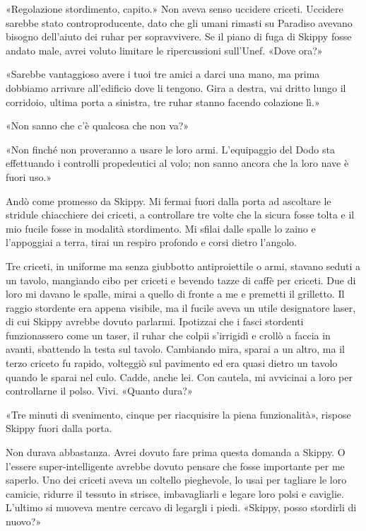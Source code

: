 «Regolazione stordimento, capito.» Non aveva senso uccidere criceti.
Uccidere sarebbe stato controproducente, dato che gli umani rimasti su
Paradiso avevano bisogno dell'aiuto dei ruhar per sopravvivere. Se il
piano di fuga di Skippy fosse andato male, avrei voluto limitare le
ripercussioni sull'Unef. «Dove ora?»

«Sarebbe vantaggioso avere i tuoi tre amici a darci una mano, ma prima
dobbiamo arrivare all'edificio dove li tengono. Gira a destra, vai
dritto lungo il corridoio, ultima porta a sinistra, tre ruhar stanno
facendo colazione lì.»

«Non sanno che c'è qualcosa che non va?»

«Non finché non proveranno a usare le loro armi. L'equipaggio del Dodo
sta effettuando i controlli propedeutici al volo; non sanno ancora che
la loro nave è fuori uso.»

Andò come promesso da Skippy. Mi fermai fuori dalla porta ad ascoltare
le stridule chiacchiere dei criceti, a controllare tre volte che la
sicura fosse tolta e il mio fucile fosse in modalità stordimento. Mi
sfilai dalle spalle lo zaino e l'appoggiai a terra, tirai un respiro
profondo e corsi dietro l'angolo.

Tre criceti, in uniforme ma senza giubbotto antiproiettile o armi,
stavano seduti a un tavolo, mangiando cibo per criceti e bevendo tazze
di caffè per criceti. Due di loro mi davano le spalle, mirai a quello di
fronte a me e premetti il grilletto. Il raggio stordente era appena
visibile, ma il fucile aveva un utile designatore laser, di cui Skippy
avrebbe dovuto parlarmi. Ipotizzai che i fasci stordenti funzionassero
come un taser, il ruhar che colpii s'irrigidì e crollò a faccia in
avanti, sbattendo la testa sul tavolo. Cambiando mira, sparai a un
altro, ma il terzo criceto fu rapido, volteggiò sul pavimento ed era
quasi dietro un tavolo quando le sparai nel culo. Cadde, anche lei. Con
cautela, mi avvicinai a loro per controllarne il polso. Vivi. «Quanto
dura?»

«Tre minuti di svenimento, cinque per riacquisire la piena
funzionalità», rispose Skippy fuori dalla porta.

Non durava abbastanza. Avrei dovuto fare prima questa domanda a Skippy.
O l'essere super-intelligente avrebbe dovuto pensare che fosse
importante per me saperlo. Uno dei criceti aveva un coltello pieghevole,
lo usai per tagliare le loro camicie, ridurre il tessuto in strisce,
imbavagliarli e legare loro polsi e caviglie. L'ultimo si muoveva mentre
cercavo di legargli i piedi. «Skippy, posso stordirli di nuovo?»

